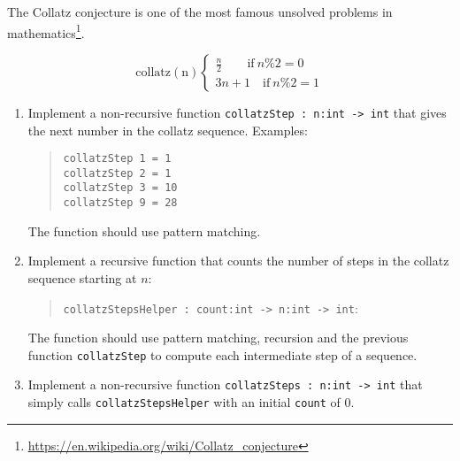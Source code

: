 The Collatz conjecture is one of the most famous unsolved problems in mathematics\footnote{\url{https://en.wikipedia.org/wiki/Collatz_conjecture}}.

\[
  \mathrm{collatz(n)}
  \begin{cases}
    \frac{n}{2} \qquad \mathrm{if} ~ n \% 2 = 0 \\
    3n+1 \quad \mathrm{if} ~ n \% 2 = 1
  \end{cases}
\]


\begin{enumerate}
  \item Implement a non-recursive function \lstinline{collatzStep : n:int -> int} that gives the next number in the collatz sequence. Examples:
  \begin{quote}
    \lstinline{collatzStep 1 = 1} \\
    \lstinline{collatzStep 2 = 1} \\
    \lstinline{collatzStep 3 = 10} \\
    \lstinline{collatzStep 9 = 28} \\    
  \end{quote}
  The function should use pattern matching. 
  \item Implement a recursive function that counts the number of steps in the collatz sequence starting at $n$:
  \begin{quote}
  \lstinline{collatzStepsHelper : count:int -> n:int -> int}:
\end{quote}
The function should use pattern matching, recursion and the previous function \lstinline{collatzStep} to compute each intermediate step of a sequence. 
  \item Implement a non-recursive function \lstinline{collatzSteps : n:int -> int} that simply calls \lstinline{collatzStepsHelper} with an initial \lstinline{count} of 0. 
\end{enumerate}
